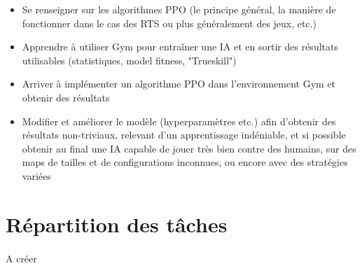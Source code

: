\documentclass[french]{article}
\begin{document}
		\begin{itemize}
			\item Se renseigner sur les algorithmes PPO  (le principe général, la manière de fonctionner dans le cas des RTS ou plus généralement des jeux, etc.)
			\vspace{2mm}
			\item Apprendre à utiliser Gym pour entraîner une IA et en sortir des résultats utilisables (statistiques, model fitness, "Trueskill")
			\vspace{2mm}
			\item Arriver à implémenter un algorithme PPO dans l'environnement Gym et obtenir des résultats
			\vspace{2mm}
			\item Modifier et améliorer le modèle (hyperparamètres etc.) afin d'obtenir des résultats non-triviaux, relevant d'un apprentissage indéniable, et si possible obtenir au final une IA capable de jouer très bien contre des humains, sur des maps de tailles et de configurations inconnues, ou encore avec des stratégies variées
		\end{itemize}

	\section{Répartition des tâches}
		\paragraph*{}
		A créer
	
	
		
\end{document}
